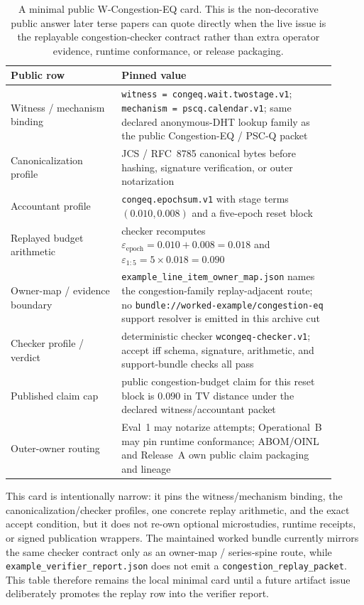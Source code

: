 \documentclass[11pt]{article}
\newcommand{\eps}{\varepsilon}
\begin{document}
\begin{table}[t]
\centering
\small
\begin{tabular}{@{}p{0.31\linewidth}p{0.60\linewidth}@{}}
\toprule
\textbf{Public row} & \textbf{Pinned value}\\
\midrule
Witness / mechanism binding & \texttt{witness = congeq.wait.twostage.v1}; \texttt{mechanism = pscq.calendar.v1}; same declared anonymous-DHT lookup family as the public Congestion-EQ / PSC-Q packet\\
Canonicalization profile & JCS / RFC~8785 canonical bytes before hashing, signature verification, or outer notarization\\
Accountant profile & \texttt{congeq.epochsum.v1} with stage terms $(0.010,0.008)$ and a five-epoch reset block\\
Replayed budget arithmetic & checker recomputes $\eps_{\mathrm{epoch}}=0.010+0.008=0.018$ and $\eps_{1:5}=5\times 0.018=0.090$\\
Owner-map / evidence boundary & \texttt{example\_line\_item\_owner\_map.json} names the congestion-family replay-adjacent route; no \texttt{bundle://worked-example/congestion-eq} support resolver is emitted in this archive cut\\
Checker profile / verdict & deterministic checker \texttt{wcongeq-checker.v1}; accept iff schema, signature, arithmetic, and support-bundle checks all pass\\
Published claim cap & public congestion-budget claim for this reset block is $0.090$ in TV distance under the declared witness/accountant packet\\
Outer-owner routing & Eval~1 may notarize attempts; Operational~B may pin runtime conformance; ABOM/OINL and Release~A own public claim packaging and lineage\\
\bottomrule
\end{tabular}
\caption{A minimal public W-Congestion-EQ card. This is the non-decorative public answer later terse papers can quote directly when the live issue is the replayable congestion-checker contract rather than extra operator evidence, runtime conformance, or release packaging.}
\label{tab:minimal-wcongeq-card}
\end{table}

This card is intentionally narrow: it pins the witness/mechanism binding, the canonicalization/checker profiles, one concrete replay arithmetic, and the exact accept condition, but it does not re-own optional microstudies, runtime receipts, or signed publication wrappers. The maintained worked bundle currently mirrors the same checker contract only as an owner-map / series-spine route, while \nolinkurl{example\_verifier\_report.json} does not emit a \nolinkurl{congestion\_replay\_packet}. This table therefore remains the local minimal card until a future artifact issue deliberately promotes the replay row into the verifier report.
\end{document}

